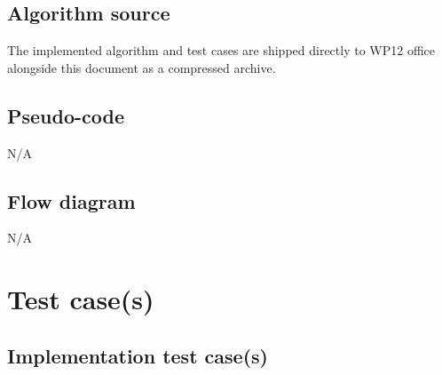 \documentclass[a4paper, oneside, 11pt, article, english]{memoir}
\begin{document}
\section{Algorithm source}
\label{sec:source}

The implemented algorithm and test cases are shipped directly to WP12 office alongside this document as a compressed archive.



\section{Pseudo-code}
\label{sec:pseudo}

N/A



\section{Flow diagram}
\label{sec:flowchart}

N/A



\clearpage
\chapter{Test case(s)}
\label{chap:tests}


\section{Implementation test case(s)}
\label{sec:test-implement}


{
  \itshape

}
\end{document}
